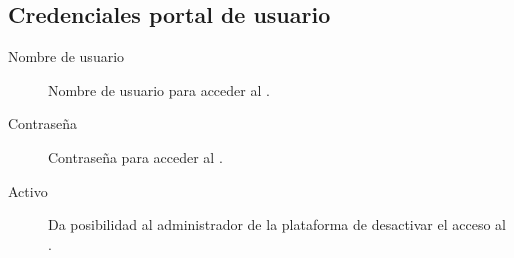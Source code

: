 \documentclass[letterpaper,10pt,spanish]{sphinxmanual}
\begin{document}
\subsection{Credenciales portal de usuario}
\label{pbx_features/users:credenciales-portal-de-usuario}
\noindent{}
\begin{description}
\item[{Nombre de usuario}] \leavevmode{}\label{pbx_features/users:term-nombre-de-usuario}
Nombre de usuario para acceder al {\hyperref[userportal/index:userportal]{}}.

\item[{Contraseña}] \leavevmode{}\label{pbx_features/users:term-contrasena}
Contraseña para acceder al {\hyperref[userportal/index:userportal]{}}.

\item[{Activo}] \leavevmode{}\label{pbx_features/users:term-activo}
Da posibilidad al administrador de la plataforma de desactivar el acceso al {\hyperref[userportal/index:userportal]{}}.

\end{description}
\end{document}
